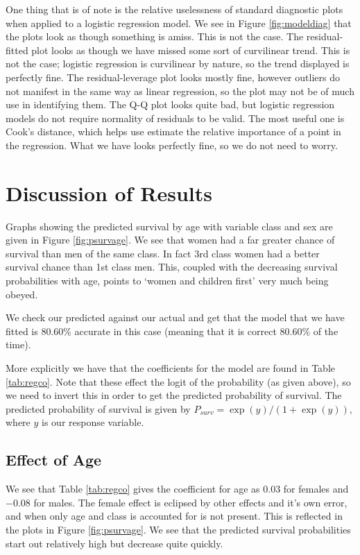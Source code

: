 \documentclass[]{extarticle}
\begin{document}
One thing that is of note is the relative uselessness of standard diagnostic plots when applied to a logistic regression model. We see in Figure \ref{fig:modeldiag} that the plots look as though something is amiss. This is not the case. The residual-fitted plot looks as though we have missed some sort of curvilinear trend. This is not the case; logistic regression is curvilinear by nature, so the trend displayed is perfectly fine. The residual-leverage plot looks mostly fine, however outliers do not manifest in the same way as linear regression, so the plot may not be of much use in identifying them. The Q-Q plot looks quite bad, but logistic regression models do not require normality of residuals to be valid. The most useful one is Cook's distance, which helps use estimate the relative importance of a point in the regression. What we have looks perfectly fine, so we do not need to worry.

\section{Discussion of Results}

Graphs showing the predicted survival by age with variable class and sex are given in Figure \ref{fig:psurvage}. We see that women had a far greater chance of survival than men of the same class. In fact 3rd class women had a better survival chance than 1st class men. This, coupled with the decreasing survival probabilities with age, points to `women and children first' very much being obeyed. 

We check our predicted against our actual and get that the model that we have fitted is 80.60\% accurate in this case (meaning that it is correct 80.60\% of the time). 

More explicitly we have that the coefficients for the model are found in Table \ref{tab:regco}. Note that these effect the logit of the probability (as given above), so we need to invert this in order to get the predicted probability of survival. The predicted probability of survival is given by $P_{surv} = \exp(y)/(1+\exp(y)),$ where $y$ is our response variable.
\subsection{Effect of Age}

We see that Table \ref{tab:regco} gives the coefficient for age as $0.03$ for females and $-0.08$ for males. The female effect is eclipsed by other effects and it's own error, and when only age and class is accounted for is not present. This is reflected in the plots in Figure \ref{fig:psurvage}. We see that the predicted survival probabilities start out relatively high but decrease quite quickly.
\end{document}
